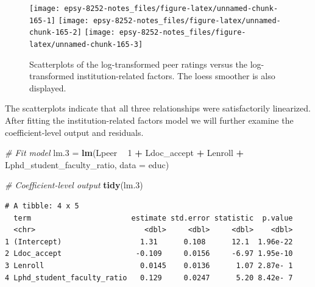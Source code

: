 \documentclass[]{book}
\newenvironment{Shaded}{\begin{snugshade}}{\end{snugshade}}
\newcommand{\CommentTok}[1]{\textcolor[rgb]{0.56,0.35,0.01}{\textit{#1}}}
\newcommand{\DataTypeTok}[1]{\textcolor[rgb]{0.13,0.29,0.53}{#1}}
\newcommand{\DecValTok}[1]{\textcolor[rgb]{0.00,0.00,0.81}{#1}}
\newcommand{\FloatTok}[1]{\textcolor[rgb]{0.00,0.00,0.81}{#1}}
\newcommand{\KeywordTok}[1]{\textcolor[rgb]{0.13,0.29,0.53}{\textbf{#1}}}
\newcommand{\NormalTok}[1]{#1}
\newcommand{\OperatorTok}[1]{\textcolor[rgb]{0.81,0.36,0.00}{\textbf{#1}}}
\newcommand{\StringTok}[1]{\textcolor[rgb]{0.31,0.60,0.02}{#1}}
\begin{document}
\begin{figure}

{\centering \texttt{[image: epsy-8252-notes\_files/figure-latex/unnamed-chunk-165-1]} \texttt{[image: epsy-8252-notes\_files/figure-latex/unnamed-chunk-165-2]} \texttt{[image: epsy-8252-notes\_files/figure-latex/unnamed-chunk-165-3]} 

}

\caption{Scatterplots of the log-transformed peer ratings versus the log-transformed institution-related factors. The loess smoother is also displayed.}\label{fig:unnamed-chunk-165}
\end{figure}

The scatterplots indicate that all three relationships were satisfactorily linearized. After fitting the institution-related factors model we will further examine the coefficient-level output and residuals.

\begin{Shaded}
\begin{Highlighting}[]
\CommentTok{# Fit model}
\NormalTok{lm}\FloatTok{.3}\NormalTok{ =}\StringTok{ }\KeywordTok{lm}\NormalTok{(Lpeer }\OperatorTok{~}\StringTok{ }\DecValTok{1} \OperatorTok{+}\StringTok{ }\NormalTok{Ldoc_accept }\OperatorTok{+}\StringTok{ }\NormalTok{Lenroll }\OperatorTok{+}\StringTok{ }\NormalTok{Lphd_student_faculty_ratio, }\DataTypeTok{data =}\NormalTok{ educ)}

\CommentTok{# Coefficient-level output}
\KeywordTok{tidy}\NormalTok{(lm}\FloatTok{.3}\NormalTok{)}
\end{Highlighting}
\end{Shaded}

\begin{verbatim}
# A tibble: 4 x 5
  term                       estimate std.error statistic  p.value
  <chr>                         <dbl>     <dbl>     <dbl>    <dbl>
1 (Intercept)                  1.31      0.108      12.1  1.96e-22
2 Ldoc_accept                 -0.109     0.0156     -6.97 1.95e-10
3 Lenroll                      0.0145    0.0136      1.07 2.87e- 1
4 Lphd_student_faculty_ratio   0.129     0.0247      5.20 8.42e- 7
\end{verbatim}
\end{document}
